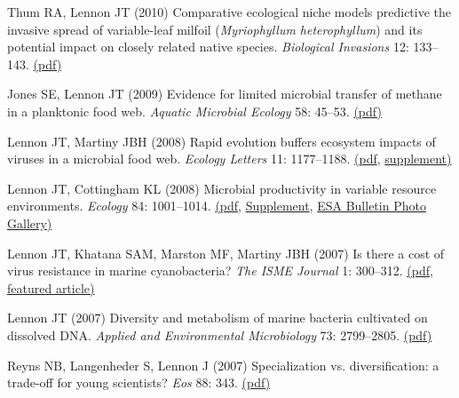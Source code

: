 \documentclass[11pt]{article}
\begin{document}
\begin{etaremune}
\item Thum RA, Lennon JT (2010) Comparative ecological niche models predictive the invasive spread of variable-leaf milfoil (\textit{Myriophyllum heterophyllum}) and its potential impact on closely related native species. \textit{Biological Invasions} 12: 133–143. \href{https://lennonlab.github.io/assets/publications/Thum_Lennon_2010.pdf}{(pdf)}

\item Jones SE, Lennon JT (2009) Evidence for limited microbial transfer of methane in a planktonic food web. \textit{Aquatic Microbial Ecology} 58: 45–53. \href{https://lennonlab.github.io/assets/publications/Jones_Lennon_2009.pdf}{(pdf)}

\item Lennon JT, Martiny JBH (2008) Rapid evolution buffers ecosystem impacts of viruses in a microbial food web. \textit{Ecology Letters} 11: 1177–1188. \href{https://lennonlab.github.io/assets/publications/Lennon_Martiny_2008.pdf}{(pdf}, \href{https://lennonlab.github.io/assets/publications/Lennon_Martiny_2008_Suppl.pdf}{supplement)}

\item Lennon JT, Cottingham KL (2008) Microbial productivity in variable resource environments. \textit{Ecology} 84: 1001–1014. \href{https://lennonlab.github.io/assets/publications/Lennon_Cottingham_2008.pdf}{(pdf}, \href{https://lennonlab.github.io/assets/publications/Lennon_Cottingham_2008_Suppl.pdf}{Supplement}, \href{https://lennonlab.github.io/assets/publications/Lennon_Cottingham_2008_ESABull.pdf}{ESA Bulletin Photo Gallery)}

\item Lennon JT, Khatana SAM, Marston MF, Martiny JBH (2007) Is there a cost of virus resistance in marine cyanobacteria? \textit{The ISME Journal} 1: 300–312. \href{https://lennonlab.github.io/assets/publications/Lennon_etal_2007.pdf}{(pdf}, \href{https://lennonlab.github.io/assets/publications/Lennon_etal_2007_ISMECov.jpg}{featured article)}

\item Lennon JT (2007) Diversity and metabolism of marine bacteria cultivated on dissolved DNA. \textit{Applied and Environmental Microbiology} 73: 2799–2805. \href{https://lennonlab.github.io/assets/publications/Lennon_2007.pdf}{(pdf)}

\item Reyns NB, Langenheder S, Lennon J (2007) Specialization vs. diversification: a trade-off for young scientists? \textit{Eos} 88: 343. \href{https://lennonlab.github.io/assets/publications/Reyns_etal_2007.pdf}{(pdf)}


\end{etaremune}
\end{document}
